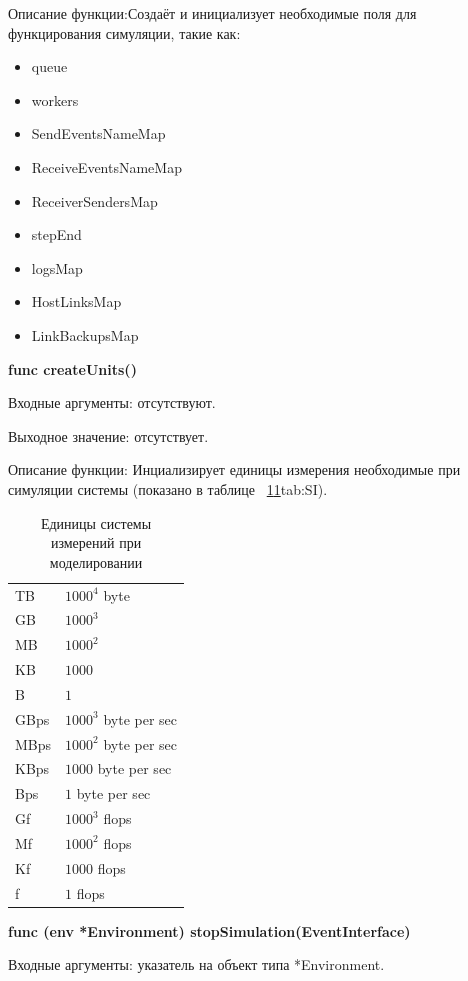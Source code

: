 Описание функции:Создаёт и инициализует необходимые поля для функцирования симуляции, такие как:
\begin{itemize}
\item 		queue           
\item 		workers        
\item 		SendEventsNameMap 
\item 		ReceiveEventsNameMap
\item 		ReceiverSendersMap
\item 		stepEnd
\item 		logsMap
\item 		HostLinksMap
\item 		LinkBackupsMap
\end{itemize}

\textbf{func createUnits()}

Входные аргументы: отсутствуют.

Выходное значение: отсутствует.

Описание функции: Инциализирует единицы измерения необходимые при симуляции системы (показано в таблице ~\ref{tab:SI}\ref{tab:SI}{tab:SI}).
\begin{table}[]
\centering
\caption{Единицы системы измерений при моделировании}
\label{tab:SI}
\begin{tabularx}{\textwidth}{|X|X|}
TB   & $1000^4$ byte         \\
GB   & $1000^3$              \\
MB   & $1000^2$              \\
KB   & $1000$                \\
B    & $1$                   \\
GBps & $1000^3$ byte per sec \\
MBps & $1000^2$ byte per sec \\
KBps & $1000$ byte per sec   \\
Bps  & $1$ byte per sec      \\
Gf   & $1000^3$ flops        \\
Mf   & $1000^2$ flops        \\
Kf   & $1000$ flops          \\
f    & $1$ flops            
\end{tabularx}
\end{table}

\textbf{func (env *Environment) stopSimulation(EventInterface)}

Входные аргументы: указатель на объект типа *Environment.

